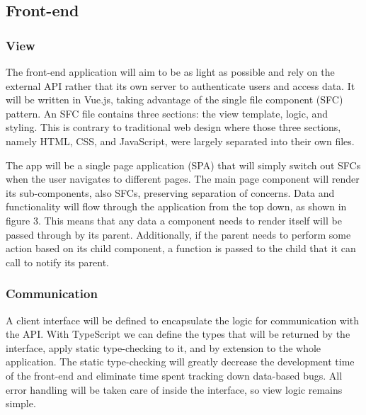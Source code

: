     \subsection{Front-end}
    \subsubsection{View}
    The front-end application will aim to be as light as possible and rely on the external API rather that its own server to authenticate users and access data. It will be written in Vue.js, taking advantage of the single file component (SFC) pattern. An SFC file contains three sections: the view template, logic, and styling. This is contrary to traditional web design where those three sections, namely HTML, CSS, and JavaScript, were largely separated into their own files. 

    The app will be a single page application (SPA) that will simply switch out SFCs when the user navigates to different pages. The main page component will render its sub-components, also SFCs, preserving separation of concerns. Data and functionality will flow through the application from the top down, as shown in figure 3. This means that any data a component needs to render itself will be passed through by its parent. Additionally, if the parent needs to perform some action based on its child component, a function is passed to the child that it can call to notify its parent.
    
    \subsubsection{Communication}
    A client interface will be defined to encapsulate the logic for communication with the API. With TypeScript we can define the types that will be returned by the interface, apply static type-checking to it, and by extension to the whole application. The static type-checking will greatly decrease the development time of the front-end and eliminate time spent tracking down data-based bugs. All error handling will be taken care of inside the interface, so view logic remains simple.
    

